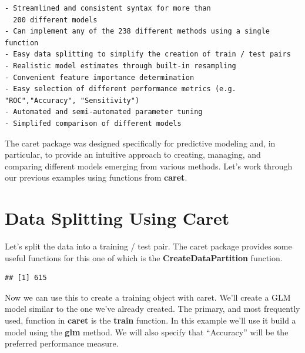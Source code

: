 \documentclass[]{book}
\newenvironment{Shaded}{\begin{snugshade}}{\end{snugshade}}
\newcommand{\KeywordTok}[1]{\textcolor[rgb]{0.13,0.29,0.53}{\textbf{#1}}}
\newcommand{\DataTypeTok}[1]{\textcolor[rgb]{0.13,0.29,0.53}{#1}}
\newcommand{\DecValTok}[1]{\textcolor[rgb]{0.00,0.00,0.81}{#1}}
\newcommand{\StringTok}[1]{\textcolor[rgb]{0.31,0.60,0.02}{#1}}
\newcommand{\OtherTok}[1]{\textcolor[rgb]{0.56,0.35,0.01}{#1}}
\newcommand{\OperatorTok}[1]{\textcolor[rgb]{0.81,0.36,0.00}{\textbf{#1}}}
\newcommand{\NormalTok}[1]{#1}
\begin{document}
\begin{verbatim}
- Streamlined and consistent syntax for more than 
  200 different models
- Can implement any of the 238 different methods using a single function
- Easy data splitting to simplify the creation of train / test pairs
- Realistic model estimates through built-in resampling
- Convenient feature importance determination
- Easy selection of different performance metrics (e.g. "ROC","Accuracy", "Sensitivity")
- Automated and semi-automated parameter tuning
- Simplifed comparison of different models
\end{verbatim}

The caret package was designed specifically for predictive modeling and,
in particular, to provide an intuitive approach to creating, managing,
and comparing different models emerging from various methods. Let's work
through our previous examples using functions from \textbf{caret}.

\section{Data Splitting Using Caret}\label{data-splitting-using-caret}

Let's split the data into a training / test pair. The caret package
provides some useful functions for this one of which is the
\textbf{CreateDataPartition} function.

\begin{Shaded}
\end{Shaded}

\begin{verbatim}
## [1] 615
\end{verbatim}

Now we can use this to create a training object with caret. We'll create
a GLM model similar to the one we've already created. The primary, and
most frequently used, function in \textbf{caret} is the \textbf{train}
function. In this example we'll use it build a model using the
\textbf{glm} method. We will also specify that ``Accuracy'' will be the
preferred performance measure.
\end{document}
